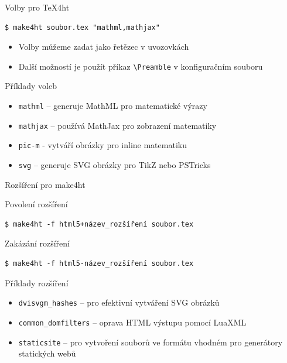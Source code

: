 \begin{frame}[fragile]{Volby pro \TeX4ht}

\begin{block}{}
\begin{verbatim}
$ make4ht soubor.tex "mathml,mathjax"
\end{verbatim}
\begin{itemize}
  \item Volby můžeme zadat jako řetězec v uvozovkách
  \item Další možností je použít příkaz \verb|\Preamble| v konfiguračním souboru
\end{itemize}
\end{block}

\begin{block}{Příklady voleb}
\begin{itemize}
  \item \texttt{mathml} – generuje MathML pro matematické výrazy
  \item \texttt{mathjax} – používá MathJax pro zobrazení matematiky
  \item \texttt{pic-m} - vytváří obrázky pro inline matematiku
  \item \texttt{svg} – generuje SVG obrázky pro TikZ nebo PSTricks
\end{itemize}
\end{block}
\end{frame}

\begin{frame}[fragile]{Rozšíření pro make4ht}
\begin{block}{Povolení rozšíření}
\begin{verbatim}
$ make4ht -f html5+název_rozšíření soubor.tex
\end{verbatim}
\end{block}
\begin{block}{Zakázání rozšíření}
\begin{verbatim}
$ make4ht -f html5-název_rozšíření soubor.tex 
\end{verbatim}
\end{block}



\begin{block}{Příklady rozšíření}
\begin{itemize}
\item \verb|dvisvgm_hashes| -- pro efektivní vytváření SVG obrázků
\item \verb|common_domfilters| -- oprava HTML výstupu pomocí LuaXML
\item \verb|staticsite| -- pro vytvoření souborů ve formátu vhodném pro generátory statických webů
\end{itemize}
\end{block}

\end{frame}

